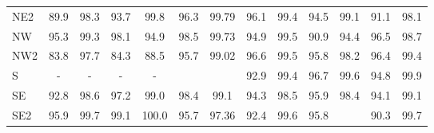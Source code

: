 \begin{table}[H]
\begin{tabular}{lcccccccccccc}
        NE2                                        & 89.9                     & 98.3                     & 93.7                     & 99.8                     & 96.3                                                & 99.79                                                & 96.1                 & 99.4 & 94.5                 & 99.1                                                & 91.1                                                & 98.1 \\
        NW                                         & 95.3                     & 99.3                     & 98.1                     & 94.9                     & 98.5                                                & 99.73                                                & 94.9                 & 99.5 & 90.9                 & 94.4                                                & 96.5                                                & 98.7 \\
        NW2                                        & 83.8                     & 97.7                     & 84.3                     & 88.5                     & 95.7                                                & 99.02                                                & 96.6                 & 99.5 & 95.8                 & 98.2                                                & 96.4                                                & 99.4 \\
        S                                          & -                        & -                        & -                        & -                        & \cellcolor[HTML]{CB0000}{\color[HTML]{FFFFFF} 22.8} & \cellcolor[HTML]{CB0000}{\color[HTML]{FFFFFF} 23.69} & 92.9                 & 99.4 & 96.7                 & 99.6                                                & 94.8                                                & 99.9 \\
        SE                                         & 92.8                     & 98.6                     & 97.2                     & 99.0                     & 98.4                                                & 99.1                                                 & 94.3                 & 98.5 & 95.9                 & 98.4                                                & 94.1                                                & 99.1 \\
        SE2                                        & 95.9                     & 99.7                     & 99.1                     & 100.0                    & 95.7                                                & 97.36                                                & 92.4                 & 99.6 & 95.8                 & \cellcolor[HTML]{CB0000}{\color[HTML]{FFFFFF} 64.2} & 90.3                                                & 99.7 \\

\end{tabular}
\end{table}
